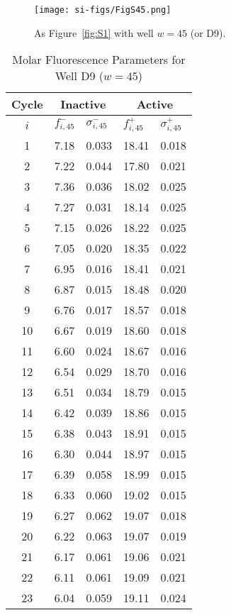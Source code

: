                 \begin{figure}
                    \centering
                    \texttt{[image: si-figs/FigS45.png]}
                    \caption{
                        As Figure~\ref{fig:S1} with well $w=45$ (or D9).
                    }
                \end{figure}
                \clearpage
    \begin{table}
        \caption{Molar Fluorescence Parameters for Well D9 ($w=45$)}
        \centering
        \begin{tabular}{c|ll|ll}
            Cycle & \multicolumn{2}{c|}{Inactive} & \multicolumn{2}{c}{Active} \\
            \hline
            $i$ & $f_{i,45}^{-}$ & $\sigma_{i,45}^{-}$ &  $f_{i,45}^{+}$ & $\sigma_{i,45}^{+}$ \\
            \hline
    1 & 7.18 & 0.033 & 18.41 & 0.018 \\
2 & 7.22 & 0.044 & 17.80 & 0.021 \\
3 & 7.36 & 0.036 & 18.02 & 0.025 \\
4 & 7.27 & 0.031 & 18.14 & 0.025 \\
5 & 7.15 & 0.026 & 18.22 & 0.025 \\
6 & 7.05 & 0.020 & 18.35 & 0.022 \\
7 & 6.95 & 0.016 & 18.41 & 0.021 \\
8 & 6.87 & 0.015 & 18.48 & 0.020 \\
9 & 6.76 & 0.017 & 18.57 & 0.018 \\
10 & 6.67 & 0.019 & 18.60 & 0.018 \\
11 & 6.60 & 0.024 & 18.67 & 0.016 \\
12 & 6.54 & 0.029 & 18.70 & 0.016 \\
13 & 6.51 & 0.034 & 18.79 & 0.015 \\
14 & 6.42 & 0.039 & 18.86 & 0.015 \\
15 & 6.38 & 0.043 & 18.91 & 0.015 \\
16 & 6.30 & 0.044 & 18.97 & 0.015 \\
17 & 6.39 & 0.058 & 18.99 & 0.015 \\
18 & 6.33 & 0.060 & 19.02 & 0.015 \\
19 & 6.27 & 0.062 & 19.07 & 0.018 \\
20 & 6.22 & 0.063 & 19.07 & 0.019 \\
21 & 6.17 & 0.061 & 19.06 & 0.021 \\
22 & 6.11 & 0.061 & 19.09 & 0.021 \\
23 & 6.04 & 0.059 & 19.11 & 0.024 \\

\end{tabular}
\end{table}
